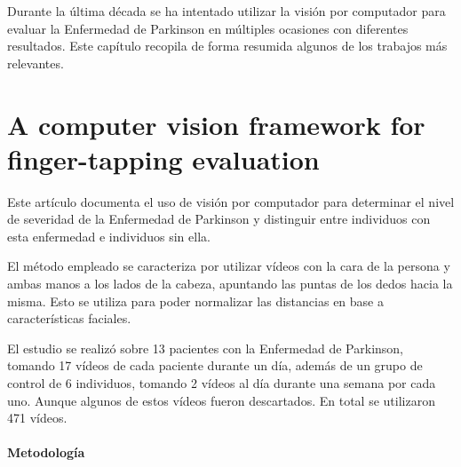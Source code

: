 \label{cha:Trabajos relacionados}

Durante la última década se ha intentado utilizar la visión por computador para
evaluar la Enfermedad de Parkinson en múltiples ocasiones con diferentes
resultados. Este capítulo recopila de forma resumida algunos de los trabajos más
relevantes.


\section{A computer vision framework for finger-tapping evaluation}

Este artículo \cite{khan2014computer} documenta el uso de visión por computador
para determinar el nivel de severidad de la Enfermedad de Parkinson y distinguir
entre individuos con esta enfermedad e individuos sin ella.

El método empleado se caracteriza por utilizar vídeos con la cara de la persona
y ambas manos a los lados de la cabeza, apuntando las puntas de los dedos hacia
la misma. Esto se utiliza para poder normalizar las distancias en base a
características faciales.

El estudio se realizó sobre 13 pacientes con la Enfermedad de Parkinson, tomando
17 vídeos de cada paciente durante un día, además de un grupo de control de 6
individuos, tomando 2 vídeos al día durante una semana por cada uno. Aunque
algunos de estos vídeos fueron descartados. En total se utilizaron 471 vídeos.


\paragraph{Metodología}

